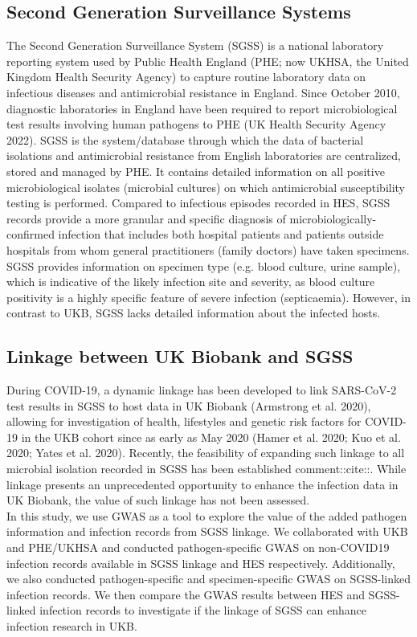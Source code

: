 \documentclass{article}
\begin{document}
\subsection{Second Generation Surveillance Systems}
The Second Generation Surveillance System (SGSS) is a national laboratory reporting system used by Public Health England (PHE; now UKHSA, the United Kingdom Health Security Agency) to capture routine laboratory data on infectious diseases and antimicrobial resistance in England. Since October 2010, diagnostic laboratories in England have been required to report microbiological test results involving human pathogens to PHE (UK Health Security Agency 2022). SGSS is the system/database through which the data of bacterial isolations and antimicrobial resistance from English laboratories are centralized, stored and managed by PHE. It contains detailed information on all positive microbiological isolates (microbial cultures) on which antimicrobial susceptibility testing is performed. Compared to infectious episodes recorded in HES, SGSS records provide a more granular and specific diagnosis of microbiologically-confirmed infection that includes both hospital patients and patients outside hospitals from whom general practitioners (family doctors) have taken specimens. SGSS provides information on specimen type (e.g. blood culture, urine sample), which is indicative of the likely infection site and severity, as blood culture positivity is a highly specific feature of severe infection (septicaemia). However, in contrast to UKB, SGSS lacks detailed information about the infected hosts.

\subsection{Linkage between UK Biobank and SGSS}
During COVID-19, a dynamic linkage has been developed to link SARS-CoV-2 test results in SGSS to host data in UK Biobank (Armstrong et al. 2020), allowing for investigation of health, lifestyles and genetic risk factors for COVID-19 in the UKB cohort since as early as May 2020 (Hamer et al. 2020; Kuo et al. 2020; Yates et al. 2020). Recently, the feasibility of expanding such linkage to all microbial isolation recorded in SGSS has been established comment::cite::. While linkage presents an unprecedented opportunity to enhance the infection data in UK Biobank, the value of such linkage has not been assessed.
\\
In this study, we use GWAS as a tool to explore the value of the added pathogen information and infection records from SGSS linkage. We collaborated with UKB and PHE/UKHSA and conducted pathogen-specific GWAS on non-COVID19 infection records available in SGSS linkage and HES respectively. Additionally, we also conducted pathogen-specific and specimen-specific GWAS on SGSS-linked infection records. We then compare the GWAS results between HES and SGSS-linked infection records to investigate if the linkage of SGSS can enhance infection research in UKB.
\end{document}
